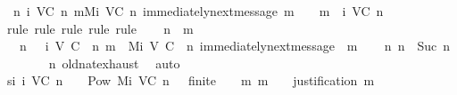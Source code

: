 \begin{isabellebody}
\ \ {\isachardoublequoteopen}{\isasymforall}n{\isasymge}{}{\isachardot}\ {\isasymforall}{\isasymsigma}{\isasymin}{\isasymSigma}i\ {\isacharparenleft}V{\isacharcomma}C{\isacharcomma}{\isasymepsilon}{\isacharparenright}\ n{\isachardot}\ {\isasymforall}m{\isasymin}Mi\ {\isacharparenleft}V{\isacharcomma}C{\isacharcomma}{\isasymepsilon}{\isacharparenright}\ n{\isachardot}\ immediately{\isacharunderscore}next{\isacharunderscore}message\ {\isacharparenleft}{\isasymsigma}{\isacharcomma}m{\isacharparenright}\ {\isasymlongrightarrow}\ {\isasymsigma}\ {\isasymunion}\ {\isacharbraceleft}m{\isacharbraceright}\ {\isasymin}\ {\isasymSigma}i\ {\isacharparenleft}V{\isacharcomma}C{\isacharcomma}{\isasymepsilon}{\isacharparenright}\ {\isacharparenleft}n{\isacharplus}{}{\isacharparenright}{\isachardoublequoteclose}\isanewline
%
\isadelimproof
\ \ %
\endisadelimproof
%
\isatagproof
{}\isamarkupfalse%
\ {\isacharparenleft}rule{\isacharcomma}\ rule{\isacharcomma}\ rule{\isacharcomma}\ rule{\isacharcomma}\ rule{\isacharparenright}\isanewline
{}\isamarkupfalse%
{\isacharminus}\isanewline
\ \ \isamarkupfalse%
\ n\ {\isasymsigma}\ m\isanewline
\ \ \isamarkupfalse%
\ {\isachardoublequoteopen}{}\ {\isasymle}\ n{\isachardoublequoteclose}\ {\isachardoublequoteopen}{\isasymsigma}\ {\isasymin}\ {\isasymSigma}i\ {\isacharparenleft}V{\isacharcomma}\ C{\isacharcomma}\ {\isasymepsilon}{\isacharparenright}\ n{\isachardoublequoteclose}\ {\isachardoublequoteopen}m\ {\isasymin}\ Mi\ {\isacharparenleft}V{\isacharcomma}\ C{\isacharcomma}\ {\isasymepsilon}{\isacharparenright}\ n{\isachardoublequoteclose}\ {\isachardoublequoteopen}immediately{\isacharunderscore}next{\isacharunderscore}message\ {\isacharparenleft}{\isasymsigma}{\isacharcomma}\ m{\isacharparenright}{\isachardoublequoteclose}\isanewline
\isanewline
\ \ \isamarkupfalse%
\ {\isachardoublequoteopen}{\isasymexists}n{\isacharprime}{\isachardot}\ n\ {\isacharequal}\ Suc\ n{\isacharprime}{\isachardoublequoteclose}\isanewline
\ \ \ \ \isamarkupfalse%
\ {\isacartoucheopen}{}\ {\isasymle}\ n{\isacartoucheclose}\ old{\isachardot}nat{\isachardot}exhaust\ \isamarkupfalse%
\ auto\isanewline
\ \ \isamarkupfalse%
\ si{\isacharcolon}\ {\isachardoublequoteopen}{\isasymSigma}i\ {\isacharparenleft}V{\isacharcomma}C{\isacharcomma}{\isasymepsilon}{\isacharparenright}\ n\ {\isacharequal}\ {\isacharbraceleft}{\isasymsigma}\ {\isasymin}\ Pow\ {\isacharparenleft}Mi\ {\isacharparenleft}V{\isacharcomma}C{\isacharcomma}{\isasymepsilon}{\isacharparenright}\ {\isacharparenleft}n\ {\isacharminus}\ {}{\isacharparenright}{\isacharparenright}{\isachardot}\ finite\ {\isasymsigma}\ {\isasymand}\ {\isacharparenleft}{\isasymforall}\ m{\isachardot}\ m\ {\isasymin}\ {\isasymsigma}\ {\isasymlongrightarrow}\ justification\ m\ {\isasymsubseteq}\ {\isasymsigma}{\isacharparenright}{\isacharbraceright}{\isachardoublequoteclose}\isanewline

\end{isabellebody}
